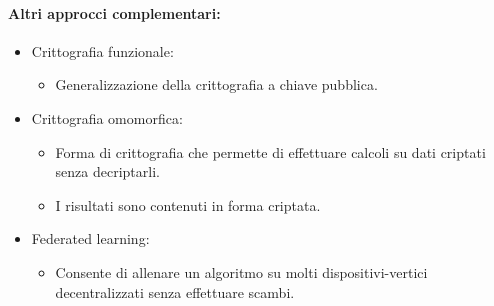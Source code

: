 \paragraph{Altri approcci complementari:}

\begin{itemize}
  \item Crittografia funzionale: 
    \begin{itemize}
      \item Generalizzazione della crittografia a chiave pubblica. 
    \end{itemize}
  \item Crittografia omomorfica: 
    \begin{itemize}
      \item Forma di crittografia che permette di effettuare calcoli su dati criptati senza decriptarli. 
      \item I risultati sono contenuti in forma criptata.
    \end{itemize}
  \item Federated learning: 
    \begin{itemize}
      \item Consente di allenare un algoritmo su molti dispositivi-vertici decentralizzati senza effettuare scambi.
    \end{itemize}
\end{itemize}


